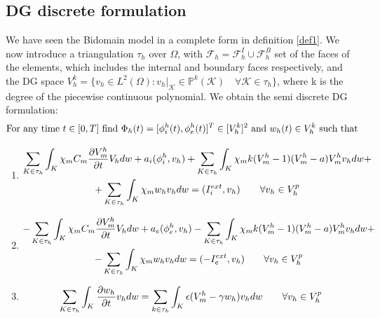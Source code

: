 \documentclass[a4paper,11pt]{article}
\begin{document}
    \subsection{DG discrete formulation}
    We have seen the Bidomain model in a complete form in definition \ref{def1}. We now introduce a triangulation $\tau_h$ over $\Omega$, with $\mathcal{F} _h=\mathcal{F} _h^I \cup \mathcal{F} _h^B$ set of the faces of the elements, which includes the internal and boundary faces respectively, and the DG space $V_h^k = \{v_h \in L^2(\Omega) : v_h|_\mathcal{K} \in \mathbb{P}^{k}(\mathcal{K})  \quad \forall \mathcal{K} \in \tau_h \}$, where k is the degree of the piecewise continuous polynomial. We obtain the semi discrete DG formulation:\vspace{4mm}
    \begin{equation*}
    \text{For any time } t \in [0,T] \text{ find } \Phi_h(t)=[\phi_i^h(t),\phi_e^h(t)]^T \in [V_h^k]^2 \text{ and } w_h(t) \in V_h^k \text{ such that}\vspace{5mm} \\
    \end{equation*}
    \begin{enumerate}
    \item 
    \begin{equation*}
    \begin{gathered}
    \sum_{K \in \tau_h} \int_K{ \chi_m C_m \pdv{V_m^h}{t} V_h dw}+a_i(\phi_i^h,v_h)+\sum_{K \in \tau_h} \int_K{ \chi_m k (V_m^h-1)(V_m^h-a) V_m^h v_h dw}+\\
    +\sum_{K \in \tau_h} \int_K{ \chi_m w_h v_h dw}=(I_i^{ext},v_h) \qquad \forall v_h \in V_h^p\\
    \end{gathered}
    \end{equation*}
    \item
    \begin{equation*}
    \begin{gathered}
    -\sum_{K \in \tau_h} \int_K{ \chi_m C_m \pdv{V_m^h}{t} V_h dw}+a_e(\phi_e^h,v_h)-\sum_{K \in \tau_h} \int_K{ \chi_m k (V_m^h-1)(V_m^h-a) V_m^h v_h dw}+\\
    -\sum_{K \in \tau_h} \int_K{ \chi_m w_h v_h dw}=(-I_e^{ext},v_h) \qquad \forall v_h \in V_h^p\\
    \end{gathered}
    \end{equation*}
    \item
    \begin{equation*}
    \sum_{K \in \tau_h} \int_K{\pdv{w_h}{t}v_h dw}=\sum_{k \in \tau_h} \int_K{\epsilon (V_m^h-\gamma w_h) v_h dw} \qquad \forall v_h \in V_h^p\\
    \end{equation*}
    \end{enumerate}
\end{document}
